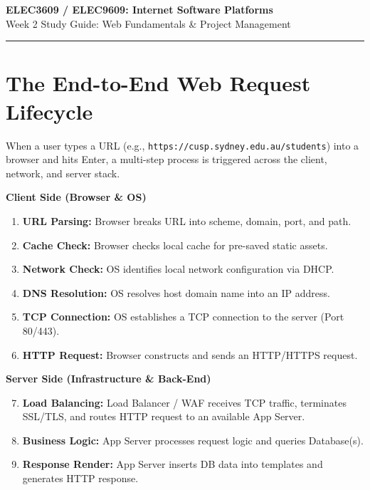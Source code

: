 \documentclass[8pt, a4paper]{article}
\begin{document}
\begin{center}
  {\LARGE\bfseries\color{accentblue} ELEC3609 / ELEC9609: Internet Software Platforms}\\[6pt]
  {\large Week 2 Study Guide: Web Fundamentals \& Project Management}
\end{center}

\vspace{12pt}
\textcolor{rulegray}{\rule{\linewidth}{1pt}}
\vspace{6pt}

\section{The End-to-End Web Request Lifecycle}

When a user types a URL (e.g., \texttt{https://cusp.sydney.edu.au/students}) into a browser and hits Enter, a multi-step process is triggered across the client, network, and server stack.

\begin{conceptbox}
\textbf{Client Side (Browser \& OS)}
\begin{enumerate}
  \item \textbf{URL Parsing:} Browser breaks URL into scheme, domain, port, and path.
  \item \textbf{Cache Check:} Browser checks local cache for pre-saved static assets.
  \item \textbf{Network Check:} OS identifies local network configuration via DHCP.
  \item \textbf{DNS Resolution:} OS resolves host domain name into an IP address.
  \item \textbf{TCP Connection:} OS establishes a TCP connection to the server (Port 80/443).
  \item \textbf{HTTP Request:} Browser constructs and sends an HTTP/HTTPS request.
\end{enumerate}
\end{conceptbox}

\begin{conceptbox}
\textbf{Server Side (Infrastructure \& Back-End)}
\begin{enumerate}
  \setcounter{enumi}{6}
  \item \textbf{Load Balancing:} Load Balancer / WAF receives TCP traffic, terminates SSL/TLS, and routes HTTP request to an available App Server.
  \item \textbf{Business Logic:} App Server processes request logic and queries Database(s).
  \item \textbf{Response Render:} App Server inserts DB data into templates and generates HTTP response.
\end{enumerate}
\end{conceptbox}
\end{document}
